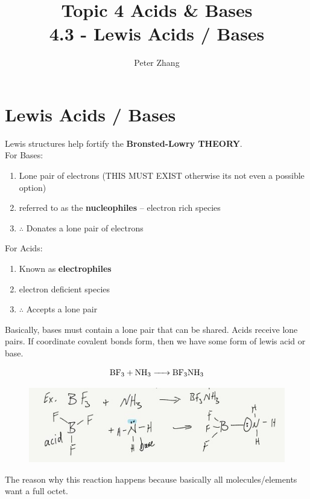 \documentclass{article}
\title{Topic 4 Acids \& Bases\\4.3 - Lewis Acids / Bases}
\author{Peter Zhang}
\begin{document}
\maketitle
\tableofcontents
\newpage

\section{Lewis Acids / Bases}
Lewis structures help fortify the \textbf{Bronsted-Lowry THEORY}. \\For Bases:
\begin{enumerate}
\item Lone pair of electrons (THIS MUST EXIST otherwise its not even a possible option)
\item referred to as the \textbf{nucleophiles} -- electron rich species
\item $\therefore $ Donates a lone pair of electrons
\end{enumerate}
For Acids:
\begin{enumerate}
\item Known as \textbf{electrophiles}
\item electron deficient species
\item $\therefore $ Accepts a lone pair
\end{enumerate}
Basically, bases must contain a lone pair that can be shared. Acids receive lone pairs. If coordinate covalent bonds form, then we have some form of lewis acid or base. 

$$\ce{BF3 + NH3 -> BF3NH3}$$
\begin{figure}[H]
\includegraphics[width=\textwidth]{4.3fig1.jpg}
\end{figure}

The reason why this reaction happens because basically all molecules/elements want a full octet.
\end{document}
